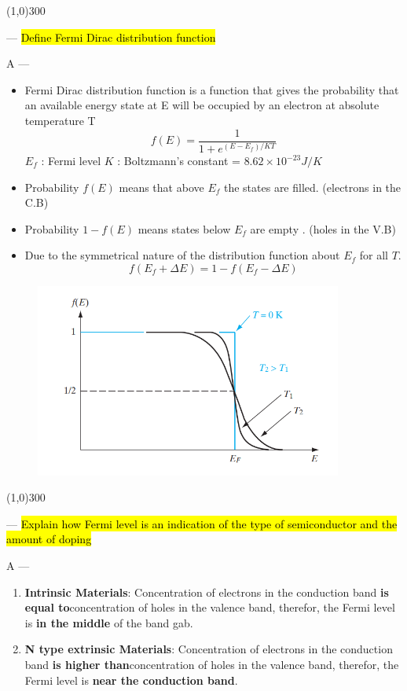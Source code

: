 \documentclass[12pt,a4paper]{article}
\newcounter{question}
\newcommand\Que[1]{
   \line(1,0){300}
   \leavevmode\par
   \stepcounter{question}
   \noindent
   \fbox{\thequestion. Q} --- \hl{#1}\par}
\newcommand\Ans[2][]{%
    \leavevmode\par\noindent
   {\leftskip16pt
    A --- \textbf{#1}#2\par}}
\begin{document}
\begin{large}
{}

\Que{
Define Fermi Dirac distribution function
}
\Ans{
\begin{itemize}
\item Fermi Dirac distribution function is a function that gives the probability that an available energy state at E will be occupied by an electron at absolute temperature T $$ f(E) = \frac{1}{1+e^{(E - E_f)/KT}} $$
$E_f$ : Fermi level
$K$ : Boltzmann's constant = $8.62 \times  10^{-23} J/K$
\item Probability $f(E)$ means that above $E_f$ the states are filled. (electrons in the C.B)
\item Probability $1-f(E)$ means states below $E_f$ are empty . (holes in the V.B)
\item Due to the symmetrical nature of the distribution function about $E_f$ for all $T$. $$f(E_f + \Delta E) =1-f(E_f - \Delta E)$$
\end{itemize}

\begin{figure}[H] 
	\centering
	\includegraphics[width = 0.9\textwidth]{fermi}
	\label{fig:fermi}
\end{figure}

}

\Que{
Explain how Fermi level is an indication of the type of semiconductor and the amount of doping
}
\Ans{
\begin{enumerate}
\item \textbf{Intrinsic Materials}: Concentration of electrons in the conduction band \textbf{is equal to}concentration of holes in the valence band, therefor, the Fermi level is \textbf{in the middle} of the band gab.

\item \textbf{N type extrinsic Materials}:   Concentration of electrons in the conduction band \textbf{is higher than}concentration of holes in the valence band, therefor, the Fermi level is \textbf{near the conduction band}.


\end{enumerate}}
\end{large}
\end{document}
